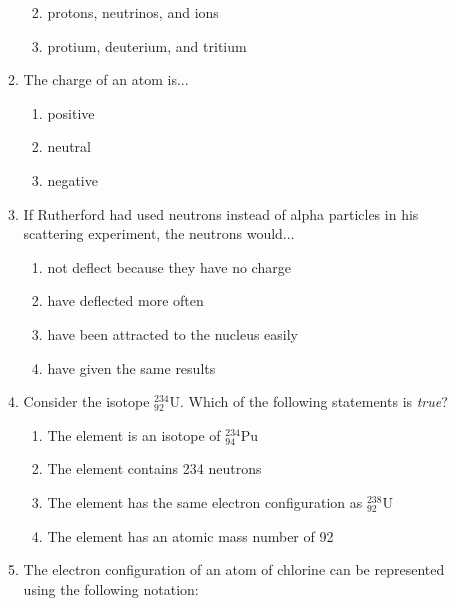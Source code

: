 \begin{enumerate}[noitemsep, label=\textbf{\arabic*}. ]
\begin{enumerate}[noitemsep, label=\textbf{\alph*}. ]
\begin{enumerate}[noitemsep, label=\textbf{\alph*}. ]
\label{m38741*uid201}\item protons, neutrinos, and ions
\label{m38741*uid202}\item protium, deuterium, and tritium
\end{enumerate}
                \label{m38741*uid203}\item The charge of an atom is...
\label{m38741*id263355}\begin{enumerate}[noitemsep, label=\textbf{\alph*}. ] 
            \label{m38741*uid204}\item positive
\label{m38741*uid205}\item neutral
\label{m38741*uid206}\item negative
\end{enumerate}
                \label{m38741*uid207}\item If Rutherford had used neutrons instead of alpha particles in his scattering experiment, the neutrons would...
\label{m38741*id263410}\begin{enumerate}[noitemsep, label=\textbf{\alph*}. ] 
            \label{m38741*uid208}\item not deflect because they have no charge
\label{m38741*uid209}\item have deflected more often
\label{m38741*uid210}\item have been attracted to the nucleus easily
\label{m38741*uid211}\item have given the same results
\end{enumerate}
                \label{m38741*uid212}\item Consider the isotope $_{92}^{234}\mathrm{U}$. Which of the following statements is \textsl{true}?
\label{m38741*id263500}\begin{enumerate}[noitemsep, label=\textbf{\alph*}. ] 
            \label{m38741*uid213}\item The element is an isotope of $_{94}^{234}\mathrm{Pu}$
\label{m38741*uid214}\item The element contains 234 neutrons
\label{m38741*uid215}\item The element has the same electron configuration as $_{92}^{238}\mathrm{U}$
\label{m38741*uid216}\item The element has an atomic mass number of 92
\end{enumerate}
                \label{m38741*uid217}\item The electron configuration of an atom of chlorine can be represented using the following notation:
\label{m38741*id263598}\begin{enumerate}[noitemsep, label=\textbf{\alph*}. ] 

\end{enumerate}
\end{enumerate}
\end{enumerate}
